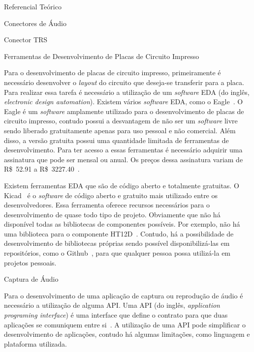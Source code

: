 \begin{chapter}{Referencial Teórico}
\begin{section}{Conectores de Áudio}
\begin{subsection}{Conector TRS}
\end{subsection}

\end{section}


\begin{section}{Ferramentas de Desenvolvimento de Placas de Circuito Impresso}

Para o desenvolvimento de placas de circuito impresso, primeiramente é
necessário desenvolver o \textit{layout} do circuito que deseja-se transferir
para a placa. Para realizar essa tarefa é necessário a utilização de um
\textit{software} EDA (do inglês, \textit{electronic design automation}).
Existem vários \textit{software} EDA, como o Eagle~\cite{eagle}. O Eagle é um
\textit{software} amplamente utilizado para o desenvolvimento de placas de
circuito impresso, contudo possui a desvantagem de não ser um \textit{software}
livre sendo liberado gratuitamente apenas para uso pessoal e não comercial. Além
disso, a versão gratuita possui uma quantidade limitada de ferramentas de
desenvolvimento. Para ter acesso a essas ferramentas é necessário adquirir uma
assinatura que pode ser mensal ou anual. Os preços dessa assinatura variam de
R\$~52.91 a R\$~3227.40~\cite{EagleAssinatura}.

Existem ferramentas EDA que são de código aberto e totalmente gratuitas. O
Kicad~\cite{kicad} é o  \textit{software} de código aberto e gratuito mais
utilizado entre os desenvolvedores. Essa ferramenta oferece recursos necessários
para o desenvolvimento de quase todo tipo de projeto. Obviamente que não
há disponível todas as bibliotecas de componentes possíveis. Por exemplo, não há
uma biblioteca para o componente HT12D~\cite{ht12d}. Contudo, há a possibilidade
de desenvolvimento de bibliotecas próprias sendo possível disponibilizá-las em
repositórios, como o Github~\cite{github}, para que qualquer pessoa possa
utilizá-la em projetos pessoais.  
\end{section}



\begin{section}{Captura de Áudio}

Para o desenvolvimento de uma aplicação de captura ou reprodução de áudio é
necessário a utilização de alguma API. Uma API (do inglês, \textit{application
programing interface}) é uma interface que define o contrato para que duas
aplicações se comuniquem entre si~\cite{API17}. A utilização de uma API pode
simplificar o desenvolvimento de aplicações, contudo há algumas limitações, como
linguagem e plataforma utilizada. 


\end{section}
\end{chapter}
